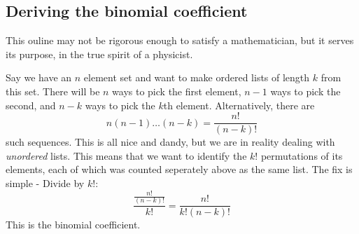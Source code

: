 \documentclass[10pt,a4paper]{amsart}
\begin{document}
\begin{appendices}
\section{Deriving the binomial coefficient}
\label{app:binom}
This ouline may not be rigorous enough to satisfy a mathematician, but it serves its purpose, in the true spirit of a physicist.

Say we have an $n$ element set and want to make ordered lists of length $k$ from this set. There will be $n$ ways to pick the first element, $n-1$ ways to pick the second, and $n-k$ ways to pick the $k$th element. Alternatively, there are
\begin{equation}
n(n-1)\dots(n-k)=\frac{n!}{(n-k)!}
\end{equation}
such sequences.
This is all nice and dandy, but we are in reality dealing with \emph{unordered} lists. This means that we want to identify the $k!$ permutations of its elements, each of which was counted seperately above as the same list. The fix is simple - Divide by $k!$:
\begin{equation}
\frac{\frac{n!}{(n-k)!}}{k!}=\frac{n!}{k!(n-k)!}
\end{equation}
This is the binomial coefficient.
\end{appendices}
\end{document}
